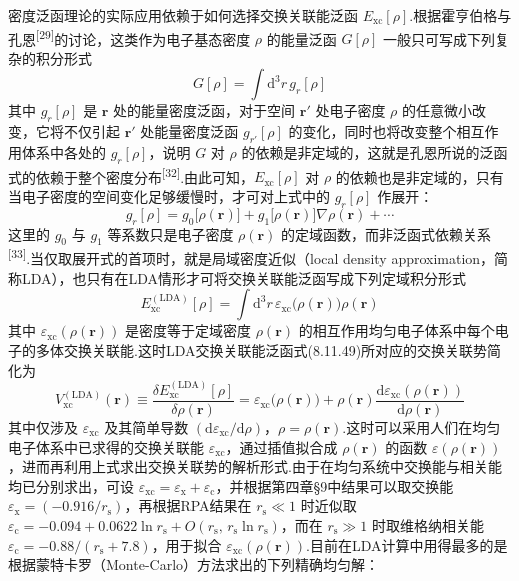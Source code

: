 密度泛函理论的实际应用依赖于如何选择交换关联能泛函 $E_{\mathrm{xc}}[\rho]$.根据霍亨伯格与孔恩\textsuperscript{[29]}的讨论，这类作为电子基态密度 $\rho$ 的能量泛函 $G[\rho]$ 一般只可写成下列复杂的积分形式
\begin{equation}
  G[\rho]=\int\mathrm{d}^{3}r\,g_{r}[\rho]
\end{equation}
其中 $g_{r}[\rho]$ 是 $\boldsymbol{r}$ 处的能量密度泛函，对于空间 $\boldsymbol{r}'$ 处电子密度 $\rho$ 的任意微小改变，它将不仅引起 $\boldsymbol{r}'$ 处能量密度泛函 $g_{r'}[\rho]$ 的变化，同时也将改变整个相互作用体系中各处的 $g_{r}[\rho]$，说明 $G$ 对 $\rho$ 的依赖是非定域的，这就是孔恩所说的泛函式的依赖于整个密度分布\textsuperscript{[32]}.由此可知，$E_{\mathrm{xc}}[\rho]$ 对 $\rho$ 的依赖也是非定域的，只有当电子密度的空间变化足够缓慢时，才可对上式中的 $g_{r}[\rho]$ 作展开：
\begin{equation}
  g_{r}[\rho]=g_{0}\bigl[\rho(\boldsymbol{r})\bigr]+g_{1}\bigl[\rho(\boldsymbol{r})\bigr]\nabla\rho(\boldsymbol{r})+\cdots
\end{equation}
这里的 $g_{0}$ 与 $g_{1}$ 等系数只是电子密度 $\rho(\boldsymbol{r})$ 的定域函数，而非泛函式依赖关系\textsuperscript{[33]}.当仅取展开式的首项时，就是局域密度近似（local density approximation，简称LDA），也只有在LDA情形才可将交换关联能泛函写成下列定域积分形式
\begin{equation}
  E_{\mathrm{xc}}^{(\mathrm{LDA})}[\rho]=\int\mathrm{d}^{3}r\,\varepsilon_{\mathrm{xc}}\bigl(\rho(\boldsymbol{r})\bigr)\rho(\boldsymbol{r})
\end{equation}
其中 $\varepsilon_{\mathrm{xc}}(\rho(\boldsymbol{r}))$ 是密度等于定域密度 $\rho(\boldsymbol{r})$ 的相互作用均匀电子体系中每个电子的多体交换关联能.这时LDA交换关联能泛函式(8.11.49)所对应的交换关联势简化为
\begin{equation}
  V_{\mathrm{xc}}^{(\mathrm{LDA})}(\boldsymbol{r})\equiv\frac{\delta E_{\mathrm{xc}}^{(\mathrm{LDA})}[\rho]}{\delta\rho(\boldsymbol{r})}
  =\varepsilon_{\mathrm{xc}}\bigl(\rho(\boldsymbol{r})\bigr)
  +\rho(\boldsymbol{r})\frac{\mathrm{d}\varepsilon_{\mathrm{xc}}(\rho(\boldsymbol{r}))}{\mathrm{d}\rho(\boldsymbol{r})}
\end{equation}
其中仅涉及 $\varepsilon_{\mathrm{xc}}$ 及其简单导数 $(\mathrm{d}\varepsilon_{\mathrm{xc}}/\mathrm{d}\rho)$，$\rho=\rho(\boldsymbol{r})$.这时可以采用人们在均匀电子体系中已求得的交换关联能 $\varepsilon_{\mathrm{xc}}$，通过插值拟合成 $\rho(\boldsymbol{r})$ 的函数 $\varepsilon(\rho(\boldsymbol{r}))$，进而再利用上式求出交换关联势的解析形式.由于在均匀系统中交换能与相关能均已分别求出，可设 $\varepsilon_{\mathrm{xc}}=\varepsilon_{\mathrm{x}}+\varepsilon_{\mathrm{c}}$，并根据第四章§9中结果可以取交换能 $\varepsilon_{\mathrm{x}}=(-0.916/r_{\mathrm{s}})$，再根据RPA结果在 $r_{\mathrm{s}}\ll 1$ 时近似取 $\varepsilon_{\mathrm{c}}=-0.094+0.0622\ln r_{\mathrm{s}}+O(r_{\mathrm{s}},\,r_{\mathrm{s}}\ln r_{\mathrm{s}})$，而在 $r_{\mathrm{s}}\gg 1$ 时取维格纳相关能 $\varepsilon_{\mathrm{c}}=-0.88/(r_{\mathrm{s}}+7.8)$，用于拟合 $\varepsilon_{\mathrm{xc}}(\rho(\boldsymbol{r}))$.目前在LDA计算中用得最多的是根据蒙特卡罗（Monte-Carlo）方法求出的下列精确均匀解：

